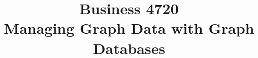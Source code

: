\documentclass{article}
\title{Business 4720\\ \vspace{\baselineskip}
Managing Graph Data with Graph Databases}
\begin{document}
\maketitle

\vfill

\clearpage


\end{document}
